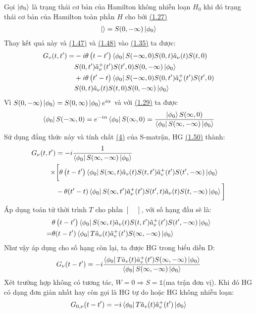 \documentclass{report}
\begin{document}
Gọi $\ket{\phi_0}$ là trạng thái cơ bản của Hamilton không nhiễn loạn $H_0$ khi đó trạng thái cơ bản của Hamilton toàn phần $H$ cho bởi \hyperref[eq1.27]{(1.27)}
\begin{align}
	\ket{} = S(0,-\infty) \ket{\phi_0}
\end{align}
Thay kết quả này và \hyperref[eq1.47]{(1.47)} và \hyperref[eq1.48]{(1.48)} vào \hyperref[eq1.35]{(1.35)} ta được:
\begin{align}
	G_{v}(t,t') =
	 & -i\theta\left( t-t' \right) \bra{\phi_0} S(-\infty,0)S(0,t) \hat{a}_{\nu}(t) S(t,0)\nonumber        \\
	 & S(0,t')\hat{a}^{+}_{\nu}(t')S(t',0)S(0,-\infty)\ket{\phi_0}\nonumber                                \\
	 & +i\theta\left( t'-t \right) \bra{\phi_0} S(-\infty,0)S(0,t') \hat{a}^{+}_{\nu}(t') S(t',0)\nonumber \\
	 & S(0,t)\hat{a}_{\nu}(t)S(t,0)S(0,-\infty)\ket{\phi_0}
\end{align}
Vì $S(0,-\infty)\ket{\phi_0} = S(0,\infty)\ket{\phi_0}e^{i\alpha}$ và với \hyperref[eq1.29]{(1.29)} ta được
\begin{align}
	\bra{\phi_0} S(-\infty,0) = e^{-i\alpha}\bra{\phi_0}S(\infty,0) = \dfrac{\ket{\phi_0}S(\infty,0)}{ \bra{\phi_0} S(\infty,-\infty)\ket{\phi_0} }
\end{align}
Sử dụng đẳng thức này và tính chất \hyperref[tc4]{(4)} của S-matrận, HG \hyperref[eq1.50]{(1.50)} thành:
\begin{align}
	G_{\nu}(t,t') & = -i \dfrac{1}{\bra{\phi_0}S(\infty,-\infty)\ket{\phi_0}}\nonumber                                                                       \\
	\times        & \bigg[ \theta \left( t-t' \right) \bra{\phi_0} S(\infty,t)\hat{a}_{v}(t) S(t,t') \hat{a}_{v}^{+}(t') S(t',-\infty) \ket{\phi_0}\nonumber \\
	              & - \theta(t'-t)\bra{\phi_0} S(\infty,t')\hat{a}_{\nu}^{+}(t')S(t',t)\hat{a}_{\nu}(t)S(t,-\infty)\ket{\phi_0}\bigg]
\end{align}
Áp dụng toán tử thời trình $T$ cho phần $\left[\quad \right]$, với số hạng đầu sẽ là:
\begin{align}
	  & \theta \left( t-t' \right) \bra{\phi_0} S(\infty,t)\hat{a}_{v}(t) S(t,t') \hat{a}_{v}^{+}(t') S(t',-\infty) \ket{\phi_0}\nonumber \\
	= & \theta(t-t') \bra{\phi_0} T \hat{a}_{v}(t) \hat{a}_{v}^{+}(t') S(\infty,-\infty) \ket{\phi_0}\nonumber
\end{align}
Như vậy áp dụng cho số hạng còn lại, ta được HG trong biểu diễn D:
\begin{align}
	G_{\nu}(t-t') = -i \dfrac{\bra{\phi_0} T \hat{a}_{v}(t) \hat{a}_{v}^{+}(t') S(\infty,-\infty) \ket{\phi_0}}{\bra{\phi_0}S(\infty,-\infty)\ket{\phi_0}}
\end{align}
Xét trường hợp không có tương tác, $W = 0 \Rightarrow S = \mathbb{1} $(ma trận đơn vị). Khi đó HG có dạng đơn giản nhất hay còn gọi là HG tự do hoặc HG không nhiễu loạn:
\begin{align}
	\label{eq1.54}
	G_{0,\nu} (t-t') = -i  \bra{\phi_0} T \hat{a}_{v}(t) \hat{a}_{v}^{+}(t')\ket{\phi_0}
\end{align}
\end{document}
